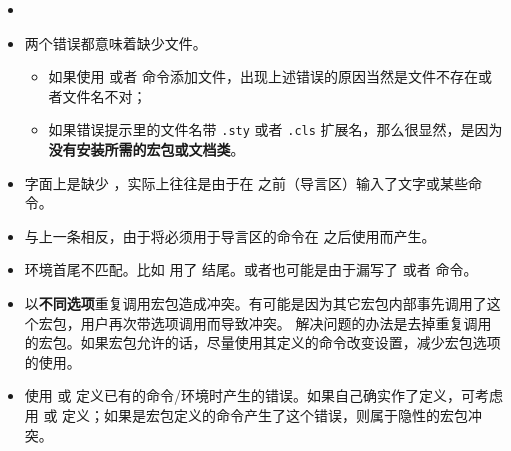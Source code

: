 \begin{itemize}
两个错误信息都与列表环境和  命令有关。前者意味着在没有使用列表环境的情况下用了 ；
后者则相反，是在列表环境中漏了 。

\item {}

\item {}

两个错误都意味着缺少文件。
\begin{itemize}
  \item 如果使用  或者  命令添加文件，出现上述错误的原因当然是文件不存在或者文件名不对；
  \item 如果错误提示里的文件名带 \texttt{.sty} 或者 \texttt{.cls} 扩展名，那么很显然，是因为\textbf{没有安装所需的宏包或文档类}。
\end{itemize}

\item {}

字面上是缺少 ，实际上往往是由于在  之前（导言区）输入了文字或某些命令。

\item {}

与上一条相反，由于将必须用于导言区的命令在  之后使用而产生。

\item {}

环境首尾不匹配。比如  用了  结尾。或者也可能是由于漏写了 
或者  命令。

\item {}

以\textbf{不同选项}重复调用宏包造成冲突。有可能是因为其它宏包内部事先调用了这个宏包，用户再次带选项调用而导致冲突。
解决问题的办法是去掉重复调用的宏包。如果宏包允许的话，尽量使用其定义的命令改变设置，减少宏包选项的使用。

\item {}

使用  或  定义已有的命令/环境时产生的错误。如果自己确实作了定义，可考虑用
 或  定义；如果是宏包定义的命令产生了这个错误，则属于隐性的宏包冲突。


\end{itemize}
